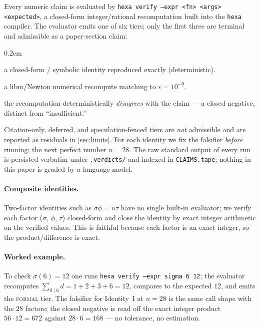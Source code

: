 \documentclass[11pt,a4paper]{article}
\newcommand{\sig}{\sigma}
\theoremstyle{definition}
\begin{document}
Every numeric claim is evaluated by \texttt{hexa verify --expr <fn> <args>
<expected>}, a closed-form integer/rational recomputation built into the
\texttt{hexa} compiler. The evaluator emits one of six tiers; only the first
three are terminal and admissible as a paper-section claim:
\begin{description}\itemsep0.2em
\item[\textcolor{blue!60!black}{$\blacklozenge$}\,\textsc{formal}] a closed-form / symbolic identity reproduced exactly (deterministic).
\item[\textcolor{green!50!black}{$\bullet$}\,\textsc{numerical}] a libm/Newton numerical recompute matching to $\varepsilon=10^{-9}$.
\item[\textcolor{red!70!black}{$\blacksquare$}\,\textsc{falsified}] the recomputation deterministically \emph{disagrees} with the claim --- a closed negative, distinct from ``insufficient.''
\end{description}
Citation-only, deferred, and speculation-fenced tiers are \emph{not} admissible
and are reported as residuals in \textsection\ref{sec:limits}. For each
identity we fix the falsifier \emph{before} running: the next perfect number
$n=28$. The raw standard output of every run is persisted verbatim under
\texttt{.verdicts/} and indexed in \texttt{CLAIMS.tape}; nothing in this paper
is graded by a language model.

\paragraph{Composite identities.} Two-factor identities such as
$\sig\phi=n\tau$ have no single built-in evaluator; we verify each factor
($\sig$, $\phi$, $\tau$) closed-form and close the identity by exact integer
arithmetic on the verified values. This is faithful because each factor is an
exact integer, so the product/difference is exact.

\paragraph{Worked example.} To check $\sig(6)=12$ one runs \texttt{hexa verify --expr sigma 6 12}; the evaluator recomputes $\sum_{d\mid 6}d=1+2+3+6=12$, compares to the expected $12$, and emits the \textsc{formal} tier. The falsifier for Identity~I at $n=28$ is the same call shape with the $28$ factors; the closed negative is read off the exact integer product $56\cdot 12=672$ against $28\cdot 6=168$ --- no tolerance, no estimation.
\end{document}
